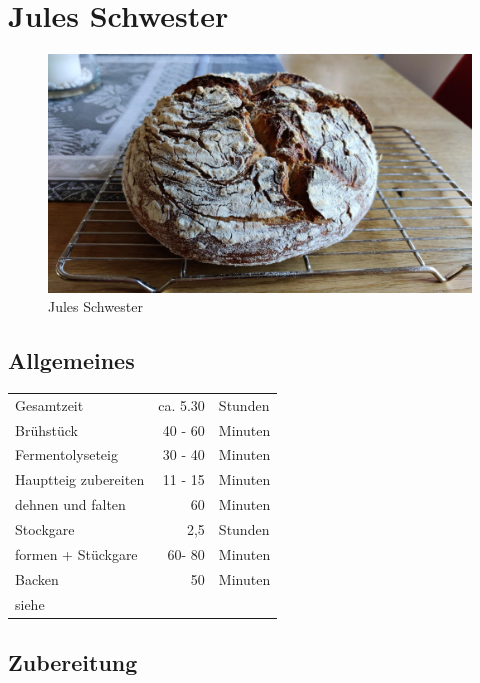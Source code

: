 \documentclass[10pt,a4paper,ngerman, DIV=16]{scrartcl}
\begin{document}
\section{Jules Schwester}  

\begin{figure}[H]
    \centering
    \includegraphics[width=0.7\linewidth]{Bilder/JulesSchwester}
    \caption{Jules Schwester}
    \label{fig:auffrischbrotJulesSchwester}
\end{figure}

\subsection*{Allgemeines}
\begin{tabular}{lrl}
    Gesamtzeit           &              ca. 5.30 & Stunden \\
    Brühstück            &               40 - 60 & Minuten \\
    Fermentolyseteig     &               30 - 40 & Minuten \\
    Hauptteig zubereiten &               11 - 15 & Minuten \\
    dehnen und falten    &                    60 & Minuten \\
    Stockgare            &               2,5  & Stunden \\
    formen + Stückgare   &                60- 80 & Minuten \\
    Backen               &                 50      & Minuten \\
    siehe                & \cite{SonjaBauer2021} &
\end{tabular}



\subsection*{Zubereitung}
\end{document}
